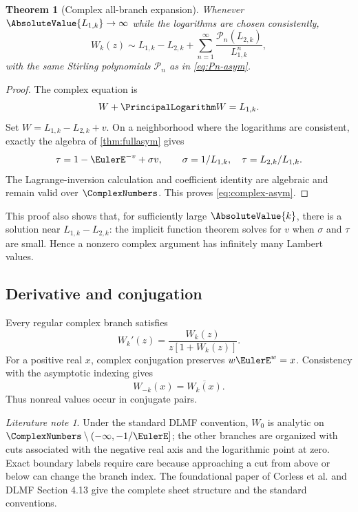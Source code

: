 \documentclass[11pt]{article}
\newtheorem{theorem}{Theorem}[section]
\theoremstyle{remark}
\newtheorem{literaturenote}[literaturenote]{Literature note}
\begin{document}
\begin{theorem}[Complex all-branch expansion]\label{thm:complex-asym}
Whenever \(\AbsoluteValue{L_{1,k}}\to\infty\) while the logarithms are chosen
consistently,
\begin{equation}\label{eq:complex-asym}
 W_k(z)\sim L_{1,k}-L_{2,k}
 +\sum_{n=1}^{\infty}
 \frac{\mathcal P_n(L_{2,k})}{L_{1,k}^n},
\end{equation}
with the same Stirling polynomials \(\mathcal P_n\) as in
\eqref{eq:Pn-asym}.
\end{theorem}

\begin{proof}
The complex equation is
\[
       W+\PrincipalLogarithm W=L_{1,k}.
\]
Set \(W=L_{1,k}-L_{2,k}+v\).  On a neighborhood where the logarithms are
consistent, exactly the algebra of \cref{thm:fullasym} gives
\[
       \tau=1-\EulerE^{-v}+\sigma v,\qquad
       \sigma=1/L_{1,k},\quad \tau=L_{2,k}/L_{1,k}.
\]
The Lagrange-inversion calculation and coefficient identity are algebraic
and remain valid over \(\ComplexNumbers\).  This proves
\eqref{eq:complex-asym}.
\end{proof}

This proof also shows that, for sufficiently large \(\AbsoluteValue{k}\), there is a
solution near \(L_{1,k}-L_{2,k}\): the implicit function theorem solves for
\(v\) when \(\sigma\) and \(\tau\) are small.  Hence a nonzero complex
argument has infinitely many Lambert values.

\subsection{Derivative and conjugation}

Every regular complex branch satisfies
\[
       W_k'(z)=\frac{W_k(z)}{z[1+W_k(z)]}.
\]
For a positive real \(x\), complex conjugation preserves
\(w\EulerE^w=x\).  Consistency with the asymptotic indexing gives
\[
       W_{-k}(x)=\overline{W_k(x)}.
\]
Thus nonreal values occur in conjugate pairs.

\begin{literaturenote}
Under the standard DLMF convention, \(W_0\) is analytic on
\(\ComplexNumbers\setminus(-\infty,-1/\EulerE]\); the other branches are organized
with cuts associated with the negative real axis and the logarithmic point
at zero.  Exact boundary labels require care because approaching a cut from
above or below can change the branch index.  The foundational paper of
Corless et al. and DLMF Section 4.13 give the complete sheet structure and
the standard conventions.
\end{literaturenote}
\end{document}

